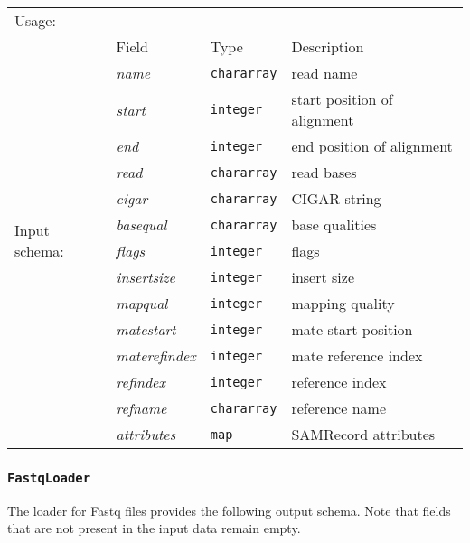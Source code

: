 \begin{tabular}{lp{}p{}p{}}
Usage: & \multicolumn{3}{l}{}
\hspace*{-0.55cm}\begin{minipage}{0.8\textwidth}
  \begin{lstlisting}
  store reads into 'output.bam' using BamStorer('input.bam.asciiheader');
  \end{lstlisting}
  \end{minipage}\hfill\kern-\arrayrulewidth
 \\[0.25cm]
\multirow{15}{*}{Input schema:} & Field & Type & Description\\[0.1cm]
& \emph{name} & \texttt{chararray} & read name\\
& \emph{start} & \texttt{integer} & start position of alignment\\
& \emph{end} & \texttt{integer} & end position of alignment\\
& \emph{read} & \texttt{chararray} & read bases\\
& \emph{cigar} & \texttt{chararray} & CIGAR string\\
& \emph{basequal} & \texttt{chararray} & base qualities\\
& \emph{flags} & \texttt{integer} & flags\\
& \emph{insertsize} & \texttt{integer} & insert size\\
& \emph{mapqual} & \texttt{integer} & mapping quality\\
& \emph{matestart} & \texttt{integer} & mate start position\\
& \emph{materefindex} & \texttt{integer} & mate reference index\\
& \emph{refindex} & \texttt{integer} & reference index\\
& \emph{refname}  & \texttt{chararray} & reference name\\
& \emph{attributes} & \texttt{map} & SAMRecord attributes
\end{tabular}

\subsubsection{\texttt{FastqLoader}}

The loader for Fastq files provides the following output schema.  Note that
fields that are not present in the input data remain empty.

